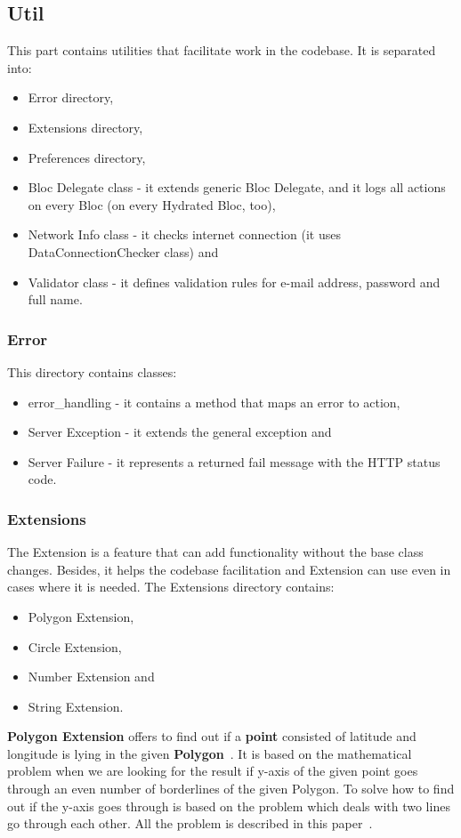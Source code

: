 \subsection{Util}\label{subsec:util}
This part contains utilities that facilitate work in the codebase.
It is separated into:
\begin{itemize}
    \item Error directory,
    \item Extensions directory,
    \item Preferences directory,
    \item Bloc Delegate class - it extends generic Bloc Delegate, and it logs all actions on every Bloc (on every Hydrated Bloc, too),
    \item Network Info class - it checks internet connection (it uses DataConnectionChecker class) and
    \item Validator class - it defines validation rules for e-mail address, password and full name.
\end{itemize}


\subsubsection{Error}\label{subsubsec:error}
This directory contains classes:
\begin{itemize}
    \item error\_handling - it contains a method that maps an error to action,
    \item Server Exception - it extends the general exception and
    \item Server Failure - it represents a returned fail message with the HTTP status code.
\end{itemize}


\subsubsection{Extensions}\label{subsubsec:extensions}
The Extension is a feature that can add functionality without the base class changes.
Besides, it helps the codebase facilitation and Extension can use even in cases where it is needed.
The Extensions directory contains:
\begin{itemize}
    \item Polygon Extension,
    \item Circle Extension,
    \item Number Extension and
    \item String Extension.
\end{itemize}
\textbf{Polygon Extension} offers to find out if a \textbf{point} consisted of latitude and longitude is lying in the given \textbf{Polygon}~\cite{googleMapsPolygon}.
It is based on the mathematical problem when we are looking for the result if y-axis of the given point goes through an even number of borderlines of the given Polygon.
To solve how to find out if the y-axis goes through is based on the problem which deals with two lines go through each other.
All the problem is described in this paper~\cite{geometricAlgorithms}.

